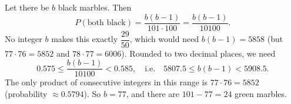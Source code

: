 Let there be $b$ black marbles. Then
\[
P(\text{both black})=\dfrac{b(b-1)}{101\cdot100}=\dfrac{b(b-1)}{10100}.
\]
No integer $b$ makes this exactly $\dfrac{29}{50}$, which would need $b(b-1)=5858$ (but $77\cdot76=5852$ and $78\cdot77=6006$). Rounded to two decimal places, we need
\[
0.575\le\dfrac{b(b-1)}{10100}<0.585,\quad\text{i.e.}\quad 5807.5\le b(b-1)<5908.5 .
\]
The only product of consecutive integers in this range is $77\cdot76=5852$ (probability $\approx0.5794$). So $b=77$, and there are $101-77=\boxed{24}$ green marbles.
